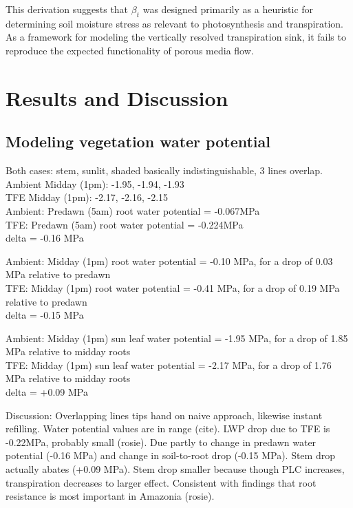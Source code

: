 \documentclass[draft,linenumbers]{agujournal}
\begin{document}
    This derivation suggests that $\beta_t$ was designed primarily as a heuristic for determining soil moisture stress
    as relevant to photosynthesis and transpiration.
    As a framework for modeling the vertically resolved transpiration sink, 
    it fails to reproduce the expected functionality of porous media flow.
    
     
    

    
\section{Results and Discussion}
\subsection{Modeling vegetation water potential}

Both cases: stem, sunlit, shaded basically indistinguishable, 3 lines overlap. \\
Ambient Midday (1pm): -1.95, -1.94, -1.93 \\
TFE Midday (1pm): -2.17, -2.16, -2.15 \\

Ambient: Predawn (5am) root water potential = -0.067MPa \\
TFE: Predawn (5am) root water potential = -0.224MPa \\
delta = -0.16 MPa

Ambient: Midday (1pm) root water potential = -0.10 MPa, for a drop of 0.03 MPa relative to predawn \\
TFE: Midday (1pm) root water potential = -0.41 MPa, for a drop of 0.19 MPa relative to predawn \\
delta = -0.15 MPa

Ambient: Midday (1pm) sun leaf water potential = -1.95 MPa, for a drop of 1.85 MPa relative to midday roots \\
TFE: Midday (1pm) sun leaf water potential = -2.17 MPa, for a drop of 1.76 MPa relative to midday roots \\
delta = +0.09 MPa

Discussion:
Overlapping lines tips hand on naive approach, likewise instant refilling.
Water potential values are in range (cite).
LWP drop due to TFE is -0.22MPa, probably small (rosie).
Due partly to change in predawn water potential (-0.16 MPa) and change in soil-to-root drop (-0.15 MPa). 
Stem drop actually abates (+0.09 MPa).
Stem drop smaller because though PLC increases, transpiration decreases to larger effect.
Consistent with findings that root resistance is most important in Amazonia (rosie).
\end{document}
